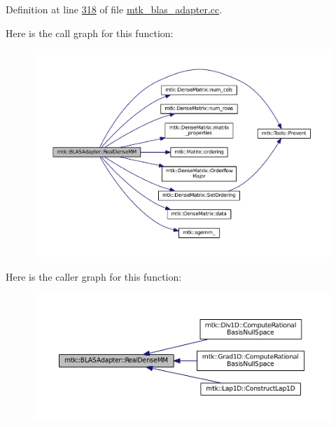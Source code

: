 Definition at line \hyperlink{mtk__blas__adapter_8cc_source_l00318}{318} of file \hyperlink{mtk__blas__adapter_8cc_source}{mtk\-\_\-blas\-\_\-adapter.\-cc}.



Here is the call graph for this function\-:\nopagebreak
\begin{figure}[H]
\begin{center}
\leavevmode
\includegraphics[width=350pt]{classmtk_1_1BLASAdapter_acebd0e9bfe0bdd609c7fbea98ccfd3b5_cgraph}
\end{center}
\end{figure}




Here is the caller graph for this function\-:\nopagebreak
\begin{figure}[H]
\begin{center}
\leavevmode
\includegraphics[width=350pt]{classmtk_1_1BLASAdapter_acebd0e9bfe0bdd609c7fbea98ccfd3b5_icgraph}
\end{center}
\end{figure}



